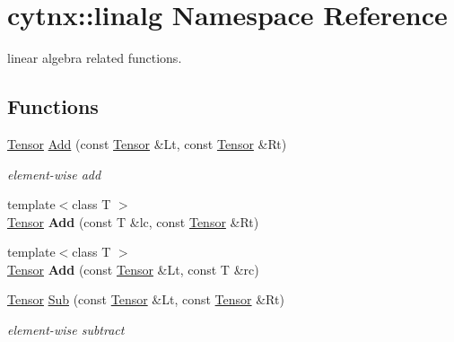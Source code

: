 \hypertarget{namespacecytnx_1_1linalg}{}\section{cytnx\+:\+:linalg Namespace Reference}
\label{namespacecytnx_1_1linalg}


linear algebra related functions.  


\subsection*{Functions}
\begin{DoxyCompactItemize}
\item 
\mbox{\label{namespacecytnx_1_1linalg_af36e9e20e4c7d74f2f6f838902482d98}} 
\hyperlink{classcytnx_1_1Tensor}{Tensor} \hyperlink{namespacecytnx_1_1linalg_af36e9e20e4c7d74f2f6f838902482d98}{Add} (const \hyperlink{classcytnx_1_1Tensor}{Tensor} \&Lt, const \hyperlink{classcytnx_1_1Tensor}{Tensor} \&Rt)
\begin{DoxyCompactList}\small\item\em element-\/wise add \end{DoxyCompactList}\item 
\mbox{\label{namespacecytnx_1_1linalg_a33643657d8cc96b037818e2003c049c7}} 
{\footnotesize template$<$class T $>$ }\\\hyperlink{classcytnx_1_1Tensor}{Tensor} {\bfseries Add} (const T \&lc, const \hyperlink{classcytnx_1_1Tensor}{Tensor} \&Rt)
\item 
\mbox{\label{namespacecytnx_1_1linalg_ae158543bf09e9e6914eab96995015d9e}} 
{\footnotesize template$<$class T $>$ }\\\hyperlink{classcytnx_1_1Tensor}{Tensor} {\bfseries Add} (const \hyperlink{classcytnx_1_1Tensor}{Tensor} \&Lt, const T \&rc)
\item 
\mbox{\label{namespacecytnx_1_1linalg_a78477b25b3eed121847f1a13b878a925}} 
\hyperlink{classcytnx_1_1Tensor}{Tensor} \hyperlink{namespacecytnx_1_1linalg_a78477b25b3eed121847f1a13b878a925}{Sub} (const \hyperlink{classcytnx_1_1Tensor}{Tensor} \&Lt, const \hyperlink{classcytnx_1_1Tensor}{Tensor} \&Rt)
\begin{DoxyCompactList}\small\item\em element-\/wise subtract \end{DoxyCompactList}\item 

\end{DoxyCompactItemize}

